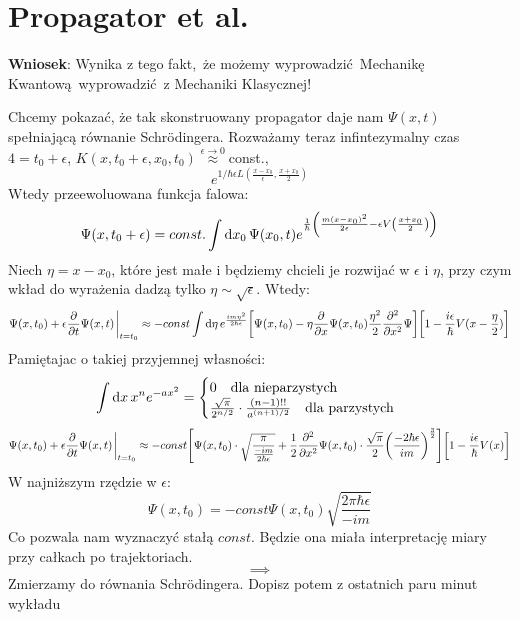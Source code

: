 \documentclass[12pt,a4paper]{report}
\newcommand{\com}[1]{{\color{red} #1}}
\renewcommand{\emph}{\textbf}
\newenvironment{lecture}[1]{\par\medskip
   \noindent\chapter{#1} \rmfamily}{\medskip}
\begin{document}
\begin{lecture}{Propagator et al.}
\emph{Wniosek}: Wynika z tego fakt, że możemy wyprowadzić Mechanikę Kwantową wyprowadzić z Mechaniki Klasycznej!

Chcemy pokazać, że tak skonstruowany propagator daje nam $\Psi(x, t)$ spełniającą równanie Schrödingera. Rozważamy teraz infintezymalny czas $4 = t_0 + \epsilon$, $K(x, t_0+\epsilon, x_0, t_0) \stackrel{\epsilon \to 0}{\approx} $const., $$e^{1/\hbar \epsilon L(\frac{x - x_0}{\epsilon}, \frac{x+x_0}{2})}$$
Wtedy przeewoluowana funkcja falowa:
\[
    \Psi(x, t_0+\epsilon) = const. \int \dd{x_0} \Psi(x_0, t)e^{\frac{1}{\hbar} \qty(\frac{m(x - x_0)^2}{2\epsilon} - \epsilon V\qty(\frac{x+x_0}{2}))}
\]
Niech $\eta = x- x_0$, które jest małe i będziemy chcieli je rozwijać w $\epsilon$ i $\eta$, przy czym wkład do wyrażenia dadzą tylko $\eta \sim \sqrt{\epsilon}$. Wtedy:
\[
    \Psi(x, t_0) + \epsilon \pdv{t} \Psi(x, t)\eval_{t = t_0} \approx -const \int \dd{\eta} e^{\frac{i m \eta^2}{2 \hbar \epsilon}} \qty[\Psi(x, t_0) - \eta \pdv{x} \Psi(x, t_0) \frac{\eta^2}{2} \pdv[2]{x}\Psi] \qty[1 - \frac{i \epsilon}{\hbar} V(x - \frac{\eta}{2})]
\]
Pamiętajac o takiej przyjemnej własności:
\color{BrickRed}
\[ \int \dd{x} x^n e^{-ax^2} = \begin{cases}
    0\qq{dla nieparzystych}\\
    \frac{\sqrt{\pi}}{2^{n/2}} \cdot \frac{(n-1)!!}{a^{(n+1)/2}}\qq{dla parzystych}
\end{cases}
\]
\color{black}
\[
    \Psi(x, t_0) + \epsilon \pdv{t} \Psi(x, t)\eval_{t = t_0} \approx -const \qty[\Psi(x, t_0)\cdot \sqrt{\frac{\pi}{\frac{-im}{2 \hbar \epsilon}}} + \frac12 \pdv[2]{x} \Psi(x, t_0) \cdot \frac{\sqrt{\pi}}{2}\qty(\frac{-2\hbar\epsilon}{i m})^{\frac32}]\qty[1 - \frac{i \epsilon}{\hbar} V(x)]
\]
W najniższym rzędzie w $\epsilon$:
\[
    \Psi(x, t_0) = - const \Psi(x, t_0) \sqrt{\frac{2 \pi \hbar \epsilon}{- i m}}
\]
Co pozwala nam wyznaczyć stałą $const$. Będzie ona miała interpretację miary przy całkach po trajektoriach. 
\[
    \implies 
\]
Zmierzamy do równania Schrödingera. \com{Dopisz potem z ostatnich paru minut wykładu}
\end{lecture}

\end{document}
